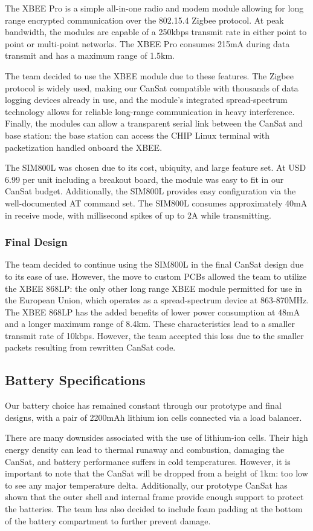 \documentclass[]{report}
\begin{document}
The XBEE Pro is a simple all-in-one radio and modem module allowing for long range encrypted communication over the 802.15.4 Zigbee protocol. At peak bandwidth, the modules are capable of a 250kbps transmit rate in either point to point or multi-point networks. The XBEE Pro consumes 215mA during data transmit and has a maximum range of 1.5km.

The team decided to use the XBEE module due to these features. The Zigbee protocol is widely used, making our CanSat compatible with thousands of data logging devices already in use, and the module's integrated spread-spectrum technology allows for reliable long-range communication in heavy interference. Finally, the modules can allow a transparent serial link between the CanSat and base station: the base station can access the CHIP Linux terminal with packetization handled onboard the XBEE. 

The SIM800L was chosen due to its cost, ubiquity, and large feature set. At USD 6.99 per unit including a breakout board, the module was easy to fit in our CanSat budget. Additionally, the SIM800L provides easy configuration via the well-documented AT command set. The SIM800L consumes approximately 40mA in receive mode, with millisecond spikes of up to 2A while transmitting.
\subsubsection{Final Design}
The team decided to continue using the SIM800L in the final CanSat design due to its ease of use. However, the move to custom PCBs allowed the team to utilize the XBEE 868LP: the only other long range XBEE module permitted for use in the European Union, which operates as a spread-spectrum device at 863-870MHz. The XBEE 868LP has the added benefits of lower power consumption at 48mA and a longer maximum range of 8.4km. These characteristics lead to a smaller transmit rate of 10kbps. However, the team accepted this loss due to the smaller packets resulting from rewritten CanSat code.
\subsection{Battery Specifications}
Our battery choice has remained constant through our prototype and final designs, with a pair of 2200mAh lithium ion cells connected via a load balancer.

There are many downsides associated with the use of lithium-ion cells. Their high energy density can lead to thermal runaway and combustion, damaging the CanSat, and battery performance suffers in cold temperatures. However, it is important to note that the CanSat will be dropped from a height of 1km: too low to see any major temperature delta. Additionally, our prototype CanSat has shown that the outer shell and internal frame provide enough support to protect the batteries. The team has also decided to include foam padding at the bottom of the battery compartment to further prevent damage.
\end{document}
